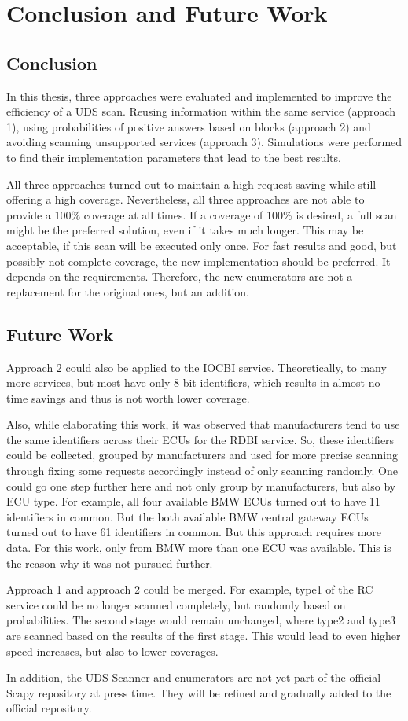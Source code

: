 \chapter{Conclusion and Future Work}

\section{Conclusion}

In this thesis, three approaches were evaluated and implemented to improve the efficiency of a UDS scan. Reusing information within the same service (approach 1), using probabilities of positive answers based on blocks (approach 2) and avoiding scanning unsupported services (approach 3). Simulations were performed to find their implementation parameters that lead to the best results.

All three approaches turned out to maintain a high request saving while still offering a high coverage.
Nevertheless, all three approaches are not able to provide a 100\% coverage at all times. 
If a coverage of 100\% is desired, a full scan might be the preferred solution, even if it takes much longer. This may be acceptable, if this scan will be executed only once. For fast results and good, but possibly not complete coverage, the new implementation should be preferred. It depends on the requirements. Therefore, the new enumerators are not a replacement for the original ones, but an addition.

\section{Future Work}

Approach 2 could also be applied to the IOCBI service. Theoretically, to many more services, but most have only 8-bit identifiers, which results in almost no time savings and thus is not worth lower coverage.

Also, while elaborating this work, it was observed that manufacturers tend to use the same identifiers across their ECUs for the RDBI service. So, these identifiers could be collected, grouped by manufacturers and used for more precise scanning through fixing some requests accordingly instead of only scanning randomly. One could go one step further here and not only group by manufacturers, but also by ECU type.
For example, all four available BMW ECUs turned out to have 11 identifiers in common. But the both available BMW central gateway ECUs turned out to have 61 identifiers in common. But this approach requires more data. For this work, only from BMW more than one ECU was available. This is the reason why it was not pursued further.

Approach 1 and approach 2 could be merged. For example, type1 of the RC service could be no longer scanned completely, but randomly based on probabilities. The second stage would remain unchanged, where type2 and type3 are scanned based on the results of the first stage. This would lead to even higher speed increases, but also to lower coverages.

In addition, the UDS Scanner and enumerators are not yet part of the official Scapy repository at press time. They will be refined and gradually added to the official repository.
